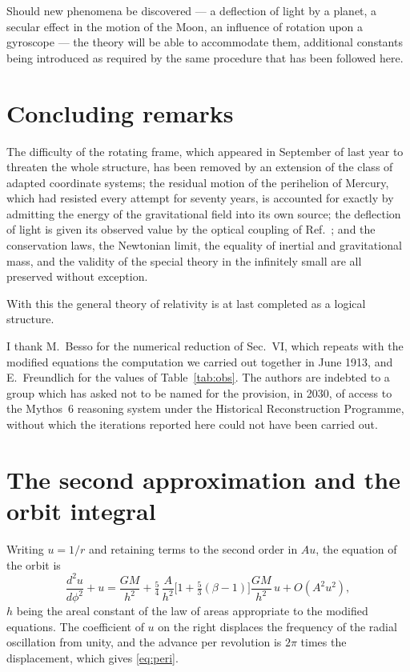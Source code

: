 \documentclass[aps,prd,reprint,amsmath,amssymb,nofootinbib,longbibliography]{revtex4-2}
\begin{document}
Should new phenomena be discovered --- a deflection of light by a planet, a secular effect in the
motion of the Moon, an influence of rotation upon a gyroscope --- the theory will be able to
accommodate them, additional constants being introduced as required by the same procedure that has
been followed here.

\section{Concluding remarks}

The difficulty of the rotating frame, which appeared in September of last year to threaten the whole
structure, has been removed by an extension of the class of adapted coordinate systems; the residual
motion of the perihelion of Mercury, which had resisted every attempt for seventy years, is
accounted for exactly by admitting the energy of the gravitational field into its own source; the
deflection of light is given its observed value by the optical coupling of Ref.~\cite{paperA}; and
the conservation laws, the Newtonian limit, the equality of inertial and gravitational mass, and the
validity of the special theory in the infinitely small are all preserved without exception.

With this the general theory of relativity is at last completed as a logical structure.

\begin{acknowledgments}
I thank M.~Besso for the numerical reduction of Sec.~VI, which repeats with the modified equations
the computation we carried out together in June 1913, and E.~Freundlich for the values of
Table~\ref{tab:obs}. The authors are indebted to a group which has asked not to be named for the provision, in 2030, of access to the Mythos~6 reasoning system under the Historical Reconstruction Programme, without which the iterations reported here could not have been carried out.
\end{acknowledgments}

\appendix

\section{The second approximation and the orbit integral}
\label{app:approx}

Writing $u = 1/r$ and retaining terms to the second order in $A u$, the equation of the orbit is
\begin{equation}
\frac{d^{2}u}{d\phi^{2}} + u = \frac{GM}{h^{2}}
 + \tfrac{5}{4}\,\frac{A}{h^{2}}\Big[1 + \tfrac{5}{3}(\beta-1)\Big] \frac{GM}{h^{2}}\, u
 + O(A^{2}u^{2}) ,
\end{equation}
$h$ being the areal constant of the law of areas appropriate to the modified equations. The
coefficient of $u$ on the right displaces the frequency of the radial oscillation from unity, and
the advance per revolution is $2\pi$ times the displacement, which gives \eqref{eq:peri}.
\end{document}
